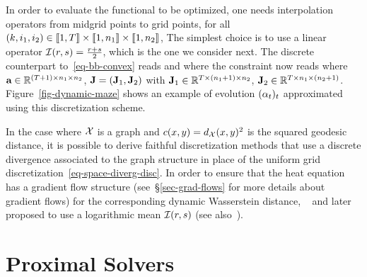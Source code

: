 In order to evaluate the functional to be optimized, one needs interpolation operators from midgrid points to grid points,
for all $(k,i_1,i_2) \in \llbracket1,T\rrbracket \times \llbracket1,n_1\rrbracket \times \llbracket1,n_2\rrbracket$,  
The simplest choice is to use a linear operator $\mathcal{I}(r,s)=\frac{r+s}{2}$, which is the one we consider next. The discrete counterpart to~\eqref{eq-bb-convex} reads
and where the constraint now reads
where $\mathrm{\textbf{a}} \in \mathbb{R}^{(T+1) \times n_1 \times n_2}$, $\mathrm{\textbf{J}}=(\mathrm{\textbf{J}}_1,\mathrm{\textbf{J}}_2)$ with $\mathrm{\textbf{J}}_1 \in \mathbb{R}^{T \times (n_1+1) \times n_2}$, $\mathrm{\textbf{J}}_2 \in \mathbb{R}^{T \times n_1 \times (n_2+1)}$.
%
Figure~\ref{fig-dynamic-maze} shows an example of evolution $(\alpha_t)_t$ approximated using this discretization scheme. 

\begin{rem}
In the case where $\mathcal{X}$ is a graph and $c(x,y)=d_{\mathcal{X}}(x,y)^2$ is the squared geodesic distance, it is possible to derive faithful discretization methods that use a discrete divergence associated to the graph structure in place of the uniform grid discretization~\eqref{eq-space-diverg-disc}. In order to ensure that the heat equation has a gradient flow structure (see~\S\ref{sec-grad-flows} for more details about gradient flows) for the corresponding dynamic Wasserstein distance, ~\citet{Maas2011} and later ~\citet{MielkeCVPDE} proposed to use a logarithmic mean $\mathcal{I}(r,s)$ (see also~\citep{solomon2016continuous,ChowHuangLiZhou2012,chow2017entropy,chow2017discrete}). 
\end{rem}

\section{Proximal Solvers}
\label{sec-prox-solvers}

